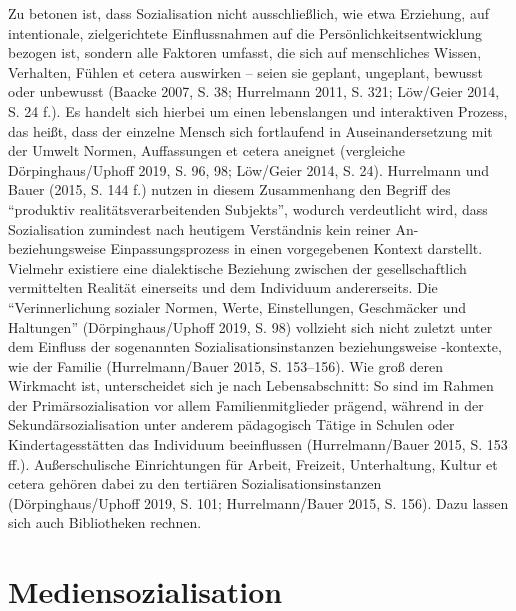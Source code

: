 \documentclass[a4paper,
fontsize=11pt,
oneside,
numbers=noperiodatend,
parskip=half-,
bibliography=totoc,
final
]{scrartcl}
\begin{document}
Zu betonen ist, dass Sozialisation nicht ausschließlich, wie etwa
Erziehung, auf intentionale, zielgerichtete Einflussnahmen auf die
Persönlichkeitsentwicklung bezogen ist, sondern alle Faktoren umfasst,
die sich auf menschliches Wissen, Verhalten, Fühlen et cetera auswirken
-- seien sie geplant, ungeplant, bewusst oder unbewusst (Baacke 2007, S.
38; Hurrelmann 2011, S. 321; Löw/Geier 2014, S. 24 f.). Es handelt sich
hierbei um einen lebenslangen und interaktiven Prozess, das heißt, dass
der einzelne Mensch sich fortlaufend in Auseinandersetzung mit der
Umwelt Normen, Auffassungen et cetera aneignet (vergleiche
Dörpinghaus/Uphoff 2019, S. 96, 98; Löw/Geier 2014, S. 24). Hurrelmann
und Bauer (2015, S. 144 f.) nutzen in diesem Zusammenhang den Begriff
des \enquote{produktiv realitätsverarbeitenden Subjekts}, wodurch
verdeutlicht wird, dass Sozialisation zumindest nach heutigem
Verständnis kein reiner An- beziehungsweise Einpassungsprozess in einen
vorgegebenen Kontext darstellt. Vielmehr existiere eine dialektische
Beziehung zwischen der gesellschaftlich vermittelten Realität einerseits
und dem Individuum andererseits. Die \enquote{Verinnerlichung sozialer
Normen, Werte, Einstellungen, Geschmäcker und Haltungen}
(Dörpinghaus/Uphoff 2019, S. 98) vollzieht sich nicht zuletzt unter dem
Einfluss der sogenannten Sozialisationsinstanzen beziehungsweise
-kontexte, wie der Familie (Hurrelmann/Bauer 2015, S. 153--156). Wie
groß deren Wirkmacht ist, unterscheidet sich je nach Lebensabschnitt: So
sind im Rahmen der Primärsozialisation vor allem Familienmitglieder
prägend, während in der Sekundärsozialisation unter anderem pädagogisch
Tätige in Schulen oder Kindertagesstätten das Individuum beeinflussen
(Hurrelmann/Bauer 2015, S. 153 ff.). Außerschulische Einrichtungen für
Arbeit, Freizeit, Unterhaltung, Kultur et cetera gehören dabei zu den
tertiären Sozialisationsinstanzen (Dörpinghaus/Uphoff 2019, S. 101;
Hurrelmann/Bauer 2015, S. 156). Dazu lassen sich auch Bibliotheken
rechnen.

\hypertarget{mediensozialisation}{%
\section{Mediensozialisation}\label{mediensozialisation}}
\end{document}

